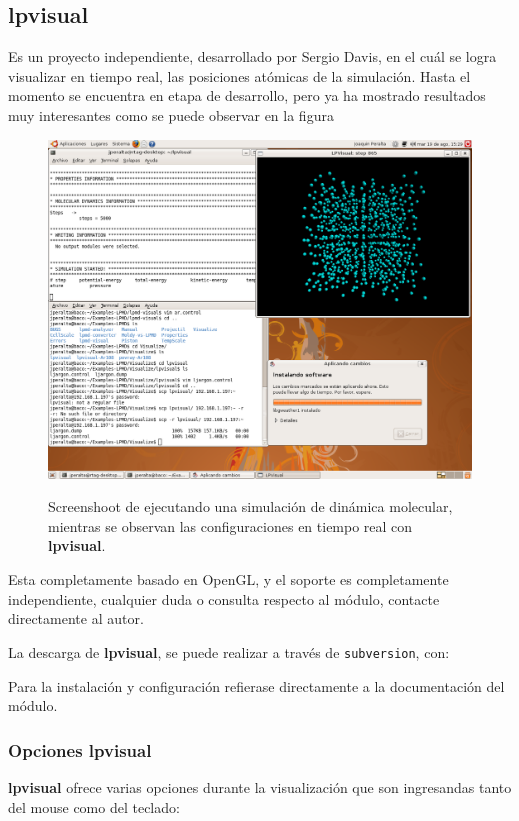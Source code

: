 \subsection{lpvisual}
Es un proyecto independiente, desarrollado por Sergio Davis, en el cu\'al se logra visualizar en tiempo real, las posiciones at\'omicas de la simulaci\'on. Hasta el momento se encuentra en etapa de desarrollo, pero ya ha mostrado resultados muy interesantes como se puede observar en la figura

\begin{figure}[h!]
 \centering
 \includegraphics[scale=.25]{lpvisual.png}
 \label{fig:lpvisual}
 \caption{Screenshoot de {\lpmd} ejecutando una simulaci\'on de din\'amica molecular, mientras se observan las configuraciones en tiempo real con \textbf{lpvisual}.}
\end{figure}

Esta completamente basado en OpenGL, y el soporte es completamente independiente, cualquier duda o consulta respecto al m\'odulo, contacte directamente al autor.

La descarga de \textbf{lpvisual}, se puede realizar a trav\'es de \verb|subversion|, con:


Para la instalaci\'on y configuraci\'on refierase directamente a la documentaci\'on del m\'odulo.

\subsubsection{Opciones lpvisual}
{\bf lpvisual} ofrece varias opciones durante la visualizaci\'on que son ingresandas tanto del mouse como del teclado:\\

